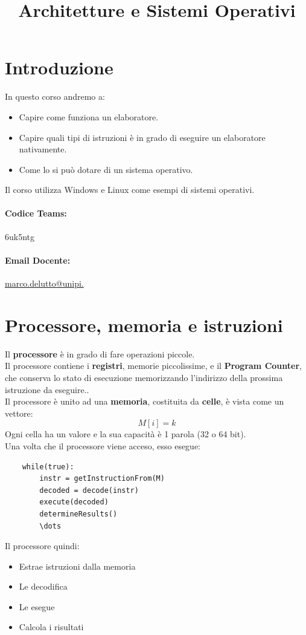 \documentclass[12pt,a4paper]{article}
\title{Architetture e Sistemi Operativi}
\author{}
\date{}
\let\oldsection\section
\renewcommand{\section}{\clearpage\oldsection}
\begin{document}
\maketitle
\tableofcontents

\section{Introduzione}
In questo corso andremo a:
\begin{itemize}
    \item Capire come funziona un elaboratore.
    \item Capire quali tipi di istruzioni è in grado di eseguire un elaboratore nativamente.
    \item Come lo si può dotare di un sistema operativo.
\end{itemize}
Il corso utilizza Windows e Linux come esempi di sistemi operativi.
\paragraph{Codice Teams:} 6uk5ntg
\paragraph{Email Docente:} \href{marco.delutto@unipi.}{marco.delutto@unipi.}

\section{Processore, memoria e istruzioni}
Il \textbf{processore} è in grado di fare operazioni piccole.\\
Il processore contiene i \textbf{registri}, memorie piccolissime, e il \textbf{Program Counter}, che conserva lo stato di esecuzione memorizzando l'indirizzo della prossima istruzione da eseguire..\\
Il processore è unito ad una \textbf{memoria}, costituita da \textbf{celle}, è vista come un vettore:
\[
M[i] = k
\]
Ogni cella ha un valore e la sua capacità è 1 parola (32 o 64 bit).\\
Una volta che il processore viene acceso, esso esegue:
\begin{lstlisting}
    while(true):
        instr = getInstructionFrom(M)
        decoded = decode(instr)
        execute(decoded)
        determineResults()
        \dots
\end{lstlisting}
Il processore quindi:
\begin{itemize}
    \item Estrae istruzioni dalla memoria
    \item Le decodifica
    \item Le esegue
    \item Calcola i risultati
\end{itemize}
\end{document}
